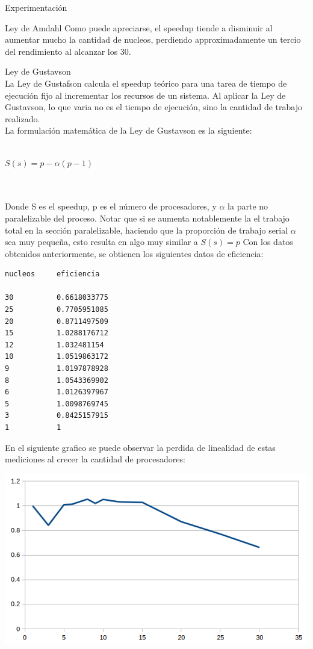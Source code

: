 \begin{section}{Experimentación}
\begin{subsection}{Ley de Amdahl}
Como puede apreciarse, el speedup tiende a disminuir al aumentar mucho la cantidad de nucleos, perdiendo approximadamente un tercio del rendimiento al alcanzar los 30.
\end{subsection}


\begin{subsection}{Ley de Gustavson}
~\\
La Ley de Gustafson calcula el speedup teórico para una tarea de tiempo de ejecución fijo al incrementar los recursos de un sistema. Al aplicar la Ley de Gustavson, lo que varia no es el tiempo de ejecución, sino la cantidad de trabajo realizado. 
~\\
La formulación matemática de la Ley de Gustavson es la siguiente:
~\\
~\\
\begin{center}
$S(s) = p - \alpha(p-1)$
\end{center}
~\\
~\\
Donde S es el speedup, p es el número de procesadores, y $\alpha$ la parte no paralelizable del proceso. Notar que si se aumenta notablemente la el trabajo total en la sección paralelizable, haciendo que la proporción de trabajo serial $\alpha$ sea muy pequeña, esto resulta en algo muy similar a $S(s) = p$
\newpage
Con los datos obtenidos anteriormente, se obtienen los siguientes datos de eficiencia:
\begin{verbatim}
nucleos     eficiencia

30			0.6618033775
25			0.7705951085
20			0.8711497509
15			1.0288176712
12			1.032481154
10			1.0519863172
9			1.0197878928
8			1.0543369902
6			1.0126397967
5			1.0098769745
3			0.8425157915
1			1
\end{verbatim}

En el siguiente grafico se puede observar la perdida de linealidad de estas mediciones al crecer la cantidad de procesadores:

\includegraphics{eficiencia}


\end{subsection}
\end{section}
